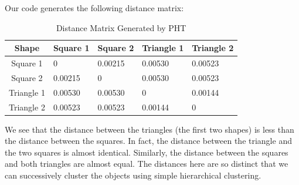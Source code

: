 \documentclass[11pt]{amsart}
\begin{document}
Our code generates the following distance matrix:
\begin{table}[]
\centering
\caption{Distance Matrix Generated by PHT}
\label{simptestdistl}
\begin{tabular}{@{}c|llll@{}}
\toprule
Shape                           & Square 1 & Square 2 & Triangle 1 & Triangle 2 \\ \midrule
Square 1                        & 0        & 0.00215  & 0.00530    & 0.00523    \\
Square 2                        & 0.00215  & 0        & 0.00530    & 0.00523    \\
Triangle 1                      & 0.00530  & 0.00530  & 0          & 0.00144    \\
\multicolumn{1}{l|}{Triangle 2} & 0.00523  & 0.00523  & 0.00144    & 0          \\ \bottomrule
\end{tabular}
\end{table}

We see that the distance between the triangles (the first two shapes) is less than the distance between the squares.  In fact, the distance between the triangle and the two squares is almost identical.  Similarly, the distance between the squares and both triangles are almost equal.  The distances here are so distinct that we can successively cluster the objects using simple hierarchical clustering.  
\end{document}
